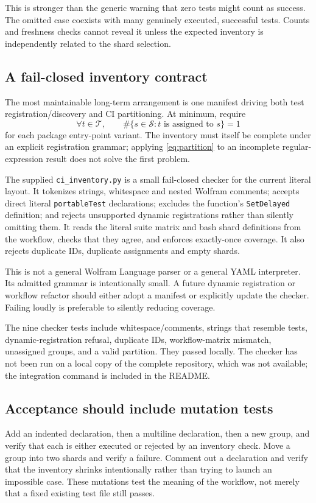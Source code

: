 \documentclass[11pt,letterpaper]{article}
\newcommand{\code}[1]{\nolinkurl{#1}}
\begin{document}
This is stronger than the generic warning that zero tests might count as
success. The omitted case coexists with many genuinely executed, successful
tests. Counts and freshness checks cannot reveal it unless the expected
inventory is independently related to the shard selection.

\subsection{A fail-closed inventory contract}
The most maintainable long-term arrangement is one manifest driving both
test registration/discovery and CI partitioning. At minimum, require
\begin{equation}
 \forall t\in\mathcal T,\qquad
 \#\{s\in\mathcal S:t\text{ is assigned to }s\}=1
 \label{eq:partition}
\end{equation}
for each package entry-point variant. The inventory must itself be complete
under an explicit registration grammar; applying \eqref{eq:partition} to an
incomplete regular-expression result does not solve the first problem.

The supplied \code{ci_inventory.py} is a small fail-closed checker for the
current literal layout. It tokenizes strings, whitespace and nested Wolfram
comments; accepts direct literal \code{portableTest} declarations; excludes
the function's \code{SetDelayed} definition; and rejects unsupported dynamic
registrations rather than silently omitting them. It reads the literal suite
matrix and bash shard definitions from the workflow, checks that they agree,
and enforces exactly-once coverage. It also rejects duplicate IDs, duplicate
assignments and empty shards.

This is not a general Wolfram Language parser or a general YAML interpreter.
Its admitted grammar is intentionally small. A future dynamic registration
or workflow refactor should either adopt a manifest or explicitly update the
checker. Failing loudly is preferable to silently reducing coverage.

The nine checker tests include whitespace/comments, strings that resemble
tests, dynamic-registration refusal, duplicate IDs, workflow-matrix mismatch,
unassigned groups, and a valid partition. They passed locally. The checker
has not been run on a local copy of the complete repository, which was not
available; the integration command is included in the README.

\subsection{Acceptance should include mutation tests}
Add an indented declaration, then a multiline declaration, then a new group,
and verify that each is either executed or rejected by an inventory check.
Move a group into two shards and verify a failure. Comment out a declaration
and verify that the inventory shrinks intentionally rather than trying to
launch an impossible case. These mutations test the meaning of the workflow,
not merely that a fixed existing test file still passes.
\end{document}
